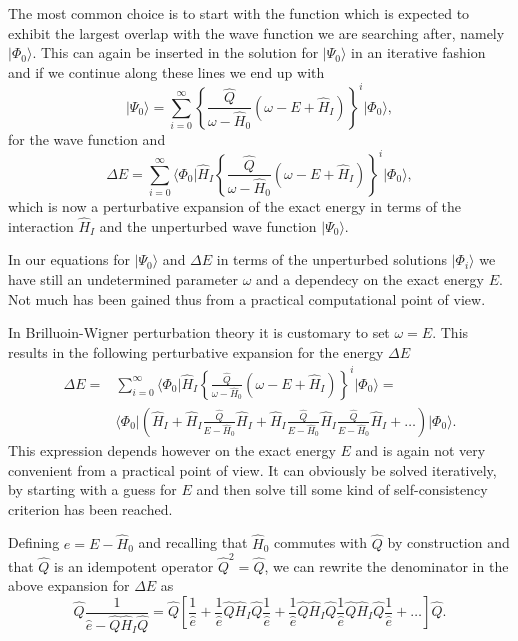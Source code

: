    The most common choice is to start with the function which is
   expected to exhibit the largest overlap with the wave function we
   are searching after, namely $\vert \Phi_0\rangle$. This can again
   be inserted in the solution for $\vert \Psi_0\rangle$ in an
   iterative fashion and if we continue along these lines we end up
   with
  \[
  \vert
  \Psi_0\rangle=\sum_{i=0}^{\infty}\left\{\frac{\hat{Q}}{\omega-\hat{H}_0}\left(\omega-E+\hat{H}_I\right)\right\}^i\vert
  \Phi_0\rangle,
  \]
  for the wave function and
  \[
  \Delta E=\sum_{i=0}^{\infty}\langle \Phi_0\vert
  \hat{H}_I\left\{\frac{\hat{Q}}{\omega-\hat{H}_0}\left(\omega-E+\hat{H}_I\right)\right\}^i\vert
  \Phi_0\rangle,
  \]
  which is now a perturbative expansion of the exact energy in terms
  of the interaction $\hat{H}_I$ and the unperturbed wave function
  $\vert \Psi_0\rangle$.



  In our equations for $\vert \Psi_0\rangle$ and $\Delta E$ in terms
  of the unperturbed solutions $\vert \Phi_i\rangle$ we have still an
  undetermined parameter $\omega$ and a dependecy on the exact energy
  $E$. Not much has been gained thus from a practical computational
  point of view.

  In Brilluoin-Wigner perturbation theory \cite{shavittbartlett2009} it is customary to set
  $\omega=E$. This results in the following perturbative expansion for
  the energy $\Delta E$
  \begin{align}
  \Delta E=&\sum_{i=0}^{\infty}\langle \Phi_0\vert
  \hat{H}_I\left\{\frac{\hat{Q}}{\omega-\hat{H}_0}\left(\omega-E+\hat{H}_I\right)\right\}^i\vert
  \Phi_0\rangle=\\ &\langle \Phi_0\vert
  \left(\hat{H}_I+\hat{H}_I\frac{\hat{Q}}{E-\hat{H}_0}\hat{H}_I+
  \hat{H}_I\frac{\hat{Q}}{E-\hat{H}_0}\hat{H}_I\frac{\hat{Q}}{E-\hat{H}_0}\hat{H}_I+\dots\right)\vert
  \Phi_0\rangle.
  \end{align}
  This expression depends however on the exact energy $E$ and is again
  not very convenient from a practical point of view. It can obviously
  be solved iteratively, by starting with a guess for $E$ and then
  solve till some kind of self-consistency criterion has been reached.

  Defining $e=E-\hat{H}_0$ and recalling that $\hat{H}_0$ commutes
  with $\hat{Q}$ by construction and that $\hat{Q}$ is an idempotent
  operator $\hat{Q}^2=\hat{Q}$, we can rewrite the denominator in the above
  expansion for $\Delta E$ as
  \[
  \hat{Q}\frac{1}{\hat{e}-\hat{Q}\hat{H}_I\hat{Q}}=\hat{Q}\left[\frac{1}{\hat{e}}+\frac{1}{\hat{e}}\hat{Q}\hat{H}_I\hat{Q}
    \frac{1}{\hat{e}}+\frac{1}{\hat{e}}\hat{Q}\hat{H}_I\hat{Q}
    \frac{1}{\hat{e}}\hat{Q}\hat{H}_I\hat{Q}\frac{1}{\hat{e}}+\dots\right]\hat{Q}.
  \]

